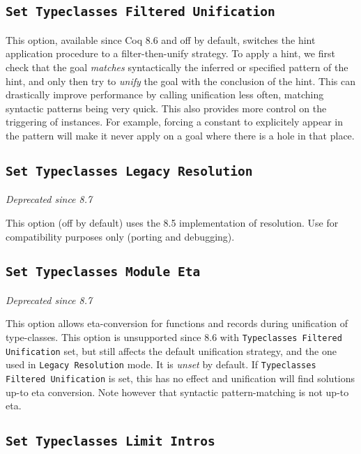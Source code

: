 \subsection{\tt Set Typeclasses Filtered Unification}

This option, available since Coq 8.6 and off by default, switches the
hint application procedure to a filter-then-unify strategy. To apply a
hint, we first check that the goal \emph{matches} syntactically the
inferred or specified pattern of the hint, and only then try to
\emph{unify} the goal with the conclusion of the hint. This can
drastically improve performance by calling unification less often,
matching syntactic patterns being very quick. This also provides more
control on the triggering of instances.  For example, forcing a constant
to explicitely appear in the pattern will make it never apply on a goal
where there is a hole in that place.

\subsection{\tt Set Typeclasses Legacy Resolution}
\emph{Deprecated since 8.7}

This option (off by default) uses the 8.5 implementation of resolution.
Use for compatibility purposes only (porting and debugging).

\subsection{\tt Set Typeclasses Module Eta}
\emph{Deprecated since 8.7}

This option allows eta-conversion for functions and records during
unification of type-classes. This option is unsupported since 8.6 with
{\tt Typeclasses Filtered Unification} set, but still affects the
default unification strategy, and the one used in {\tt Legacy
  Resolution} mode. It is \emph{unset} by default. If {\tt Typeclasses
  Filtered Unification} is set, this has no effect and unification will
find solutions up-to eta conversion. Note however that syntactic
pattern-matching is not up-to eta.

\subsection{\tt Set Typeclasses Limit Intros}

